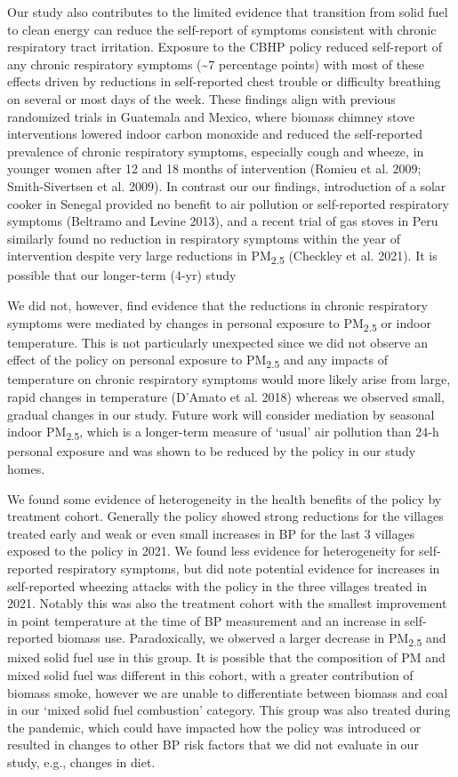 \documentclass[
  letterpaper,
  DIV=11,
  numbers=noendperiod]{scrartcl}
\begin{document}
Our study also contributes to the limited evidence that transition from
solid fuel to clean energy can reduce the self-report of symptoms
consistent with chronic respiratory tract irritation. Exposure to the
CBHP policy reduced self-report of any chronic respiratory symptoms
(\textasciitilde7 percentage points) with most of these effects driven
by reductions in self-reported chest trouble or difficulty breathing on
several or most days of the week. These findings align with previous
randomized trials in Guatemala and Mexico, where biomass chimney stove
interventions lowered indoor carbon monoxide and reduced the
self-reported prevalence of chronic respiratory symptoms, especially
cough and wheeze, in younger women after 12 and 18 months of
intervention (Romieu et al. 2009; Smith-Sivertsen et al. 2009). In
contrast our our findings, introduction of a solar cooker in Senegal
provided no benefit to air pollution or self-reported respiratory
symptoms (Beltramo and Levine 2013), and a recent trial of gas stoves in
Peru similarly found no reduction in respiratory symptoms within the
year of intervention despite very large reductions in
PM\textsubscript{2.5} (Checkley et al. 2021). It is possible that our
longer-term (4-yr) study

We did not, however, find evidence that the reductions in chronic
respiratory symptoms were mediated by changes in personal exposure to
PM\textsubscript{2.5} or indoor temperature. This is not particularly
unexpected since we did not observe an effect of the policy on personal
exposure to PM\textsubscript{2.5} and any impacts of temperature on
chronic respiratory symptoms would more likely arise from large, rapid
changes in temperature (D'Amato et al. 2018) whereas we observed small,
gradual changes in our study. Future work will consider mediation by
seasonal indoor PM\textsubscript{2.5}, which is a longer-term measure of
`usual' air pollution than 24-h personal exposure and was shown to be
reduced by the policy in our study homes.

We found some evidence of heterogeneity in the health benefits of the
policy by treatment cohort. Generally the policy showed strong
reductions for the villages treated early and weak or even small
increases in BP for the last 3 villages exposed to the policy in 2021.
We found less evidence for heterogeneity for self-reported respiratory
symptoms, but did note potential evidence for increases in self-reported
wheezing attacks with the policy in the three villages treated in 2021.
Notably this was also the treatment cohort with the smallest improvement
in point temperature at the time of BP measurement and an increase in
self-reported biomass use. Paradoxically, we observed a larger decrease
in PM\textsubscript{2.5} and mixed solid fuel use in this group. It is
possible that the composition of PM and mixed solid fuel was different
in this cohort, with a greater contribution of biomass smoke, however we
are unable to differentiate between biomass and coal in our `mixed solid
fuel combustion' category. This group was also treated during the
pandemic, which could have impacted how the policy was introduced or
resulted in changes to other BP risk factors that we did not evaluate in
our study, e.g., changes in diet.
\end{document}
